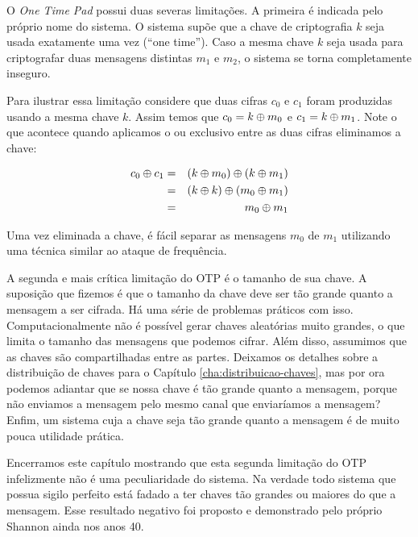 O {\em One Time Pad} possui duas severas limitações.
A primeira é indicada pelo próprio nome do sistema.
O sistema supõe que a chave de criptografia $k$ seja usada exatamente uma vez (``one time'').
Caso a mesma chave $k$ seja usada para criptografar duas mensagens distintas $m_1$ e $m_2$, o sistema se torna completamente inseguro.

Para ilustrar essa limitação considere que duas cifras $c_0$ e $c_1$ foram produzidas usando a mesma chave $k$.
Assim temos que $c_0 = k \oplus m_0$ e $c_1 = k \oplus m_1$.
Note o que acontece quando aplicamos o ou exclusivo entre as duas cifras eliminamos a chave:


\begin{eqnarray*}
  c_0 \oplus c_1 & = & (k \oplus m_0) \oplus (k \oplus m_1)\\
              & = & (k \oplus k) \oplus (m_0 \oplus m_1)\\
              & = & m_0 \oplus m_1
\end{eqnarray*}

Uma vez eliminada a chave, é fácil separar as mensagens $m_0$ de $m_1$ utilizando uma técnica similar ao ataque de frequência.

A segunda e mais crítica limitação do OTP é o tamanho de sua chave.
A suposição que fizemos é que o tamanho da chave deve ser tão grande quanto a mensagem a ser cifrada.
Há uma série de problemas práticos com isso.
Computacionalmente não é possível gerar chaves aleatórias muito grandes, o que limita o tamanho das mensagens que podemos cifrar.
Além disso, assumimos que as chaves são compartilhadas entre as partes.
Deixamos os detalhes sobre a distribuição de chaves para o Capítulo \ref{cha:distribuicao-chaves}, mas por ora podemos adiantar que se nossa chave é tão grande quanto a mensagem, porque não enviamos a mensagem pelo mesmo canal que enviaríamos a mensagem?
Enfim, um sistema cuja a chave seja tão grande quanto a mensagem é de muito pouca utilidade prática.

Encerramos este capítulo mostrando que esta segunda limitação do OTP infelizmente não é uma peculiaridade do sistema.
Na verdade todo sistema que possua sigilo perfeito está fadado a ter chaves tão grandes ou maiores do que a mensagem.
Esse resultado negativo foi proposto e demonstrado pelo próprio Shannon ainda nos anos 40.



